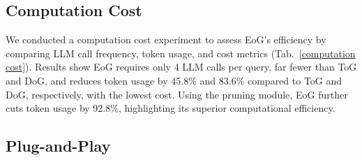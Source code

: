\documentclass[11pt]{article}
\begin{document}
\subsection{Computation Cost}
\begin{table}[]
\caption{Efficiency comparison between EoG and other advanced methods.}
\label{computation cost}
\end{table}
We conducted a computation cost experiment to assess EoG's efficiency by comparing LLM call frequency, token usage, and cost metrics (Tab.~\ref{computation cost}). Results show EoG requires only 4 LLM calls per query, far fewer than ToG and DoG, and reduces token usage by 45.8\% and 83.6\% compared to ToG and DoG, respectively, with the lowest cost. Using the pruning module, EoG further cuts token usage by 92.8\%, highlighting its superior computational efficiency.
\subsection{Plug-and-Play}
\end{document}
